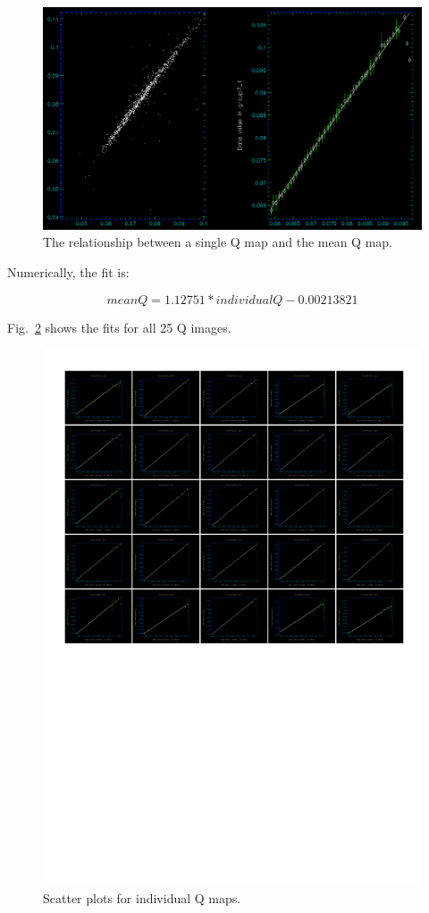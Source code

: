 \documentclass[twoside,11pt]{starlink}
\begin{document}
\begin{enumerate}
\begin{figure}
\includegraphics[width=\columnwidth]{APpic4}
\caption{The relationship between a single Q map and the mean Q map.}
\label{fig:APpic4}
\end{figure}

Numerically, the fit is:

\[ mean Q = 1.12751 * individual Q - 0.00213821 \]

Fig.~\ref{fig:APtotal} shows the fits for all 25 Q images.

\begin{figure}
\includegraphics[width=\columnwidth]{APtotal}
\caption{Scatter plots for individual Q maps.}
\label{fig:APtotal}
\end{figure}


\end{enumerate}
\end{document}
